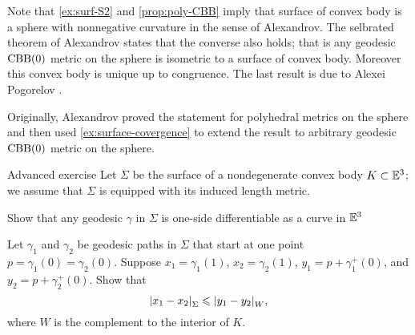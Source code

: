 Note that \ref{ex:surf-S2} and \ref{prop:poly-CBB} imply that surface of convex body is a sphere with nonnegative curvature in the sense of Alexandrov.
The selbrated theorem of Alexandrov states that the converse also holds;
that is any geodesic $\mathrm{CBB}(0)$ metric on the sphere is isometric to a surface of convex body.
Moreover this convex body is unique up to congruence.
The last result is due to Alexei Pogorelov \cite{pogorelov}.

Originally, Alexandrov proved the statement for polyhedral metrics on the sphere
and then used \ref{ex:surface-covergence} to extend the result to arbitrary geodesic $\mathrm{CBB}(0)$ metric on the sphere.


\begin{thm}{Advanced exercise}\label{ex:mklka}
Let $\Sigma$ be the surface of a nondegenerate convex body $K\subset\mathbb{E}^3$;
we assume that $\Sigma$ is equipped with its induced length metric.

\begin{subthm}
Show that any geodesic $\gamma$ in $\Sigma$ is one-side differentiable as a curve in $\mathbb{E}^3$ 
\end{subthm}

\begin{subthm}
Let $\gamma_1$ and $\gamma_2$ be geodesic paths in $\Sigma$ that start at one point $p=\gamma_1(0)=\gamma_2(0)$.
Suppose $x_1=\gamma_1(1)$, $x_2=\gamma_2(1)$, $y_1=p+\gamma_1^+(0)$, and $y_2=p+\gamma_2^+(0)$.
Show that 
\[\dist{x_1}{x_2}{\Sigma}\le \dist{y_1}{y_2}{W},\]
where $W$ is the complement to the interior of $K$.
\end{subthm}


\end{thm}

